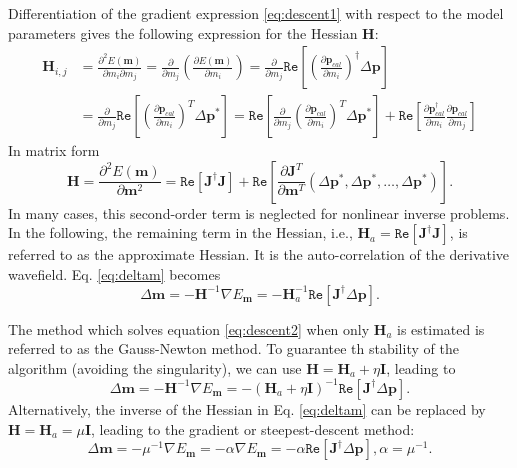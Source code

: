 Differentiation of the gradient expression \eqref{eq:descent1} with respect to the model parameters gives the following expression for the Hessian $\textbf{H}$:
\begin{equation}
\begin{split}
\textbf{H}_{i,j}&=\frac{\partial^2 E(\textbf{m})}{\partial m_i\partial m_j}
=\frac{\partial }{\partial m_j}\left(\frac{\partial E(\textbf{m})}{\partial m_i}\right)
=\frac{\partial }{\partial m_j}\mathtt{Re}\left[\left(\frac{\partial \textbf{p}_{cal}}{\partial m_i}\right)^{\dagger}\Delta \textbf{p}\right]\\
&=\frac{\partial }{\partial m_j}\mathtt{Re}\left[\left(\frac{\partial \textbf{p}_{cal}}{\partial m_i}\right)^{T}\Delta \textbf{p}^*\right]
=\mathtt{Re}\left[
\frac{\partial}{\partial m_j}\left(\frac{\partial \textbf{p}_{cal}}{\partial m_i}\right)^{T}\Delta \textbf{p}^*\right]+
\mathtt{Re}\left[
\frac{\partial\textbf{p}^{\dagger}_{cal}}{\partial m_i}\frac{\partial\textbf{p}_{cal}}{\partial m_j}\right]
\end{split}
\end{equation}
In matrix form
\begin{equation}\label{eq:descent2}
\textbf{H}=\frac{\partial^2 E(\textbf{m})}{\partial \textbf{m}^2}=\mathtt{Re}\left[\textbf{J}^{\dagger}\textbf{J}\right]+
\mathtt{Re}\left[\frac{\partial \textbf{J}^T}{\partial \textbf{m}^T}(\Delta \textbf{p}^*, \Delta \textbf{p}^*, \ldots, \Delta \textbf{p}^*)\right].
\end{equation}
In many cases, this second-order term is neglected for nonlinear inverse problems. In the following, the remaining term in the Hessian, i.e., $\textbf{H}_a=\mathtt{Re}[\textbf{J}^{\dagger}\textbf{J}]$, is referred to as the approximate Hessian. It is the auto-correlation of the derivative wavefield. Eq. \eqref{eq:deltam} becomes
\begin{equation}
\Delta \textbf{m}
=-\textbf{H}^{-1}\nabla E_{\textbf{m}}
=-\textbf{H}_a^{-1}\mathtt{Re}[\textbf{J}^{\dagger}\Delta \textbf{p}].
\end{equation}

The method which solves equation \eqref{eq:descent2} when only $\textbf{H}_a$ is estimated is referred to as the Gauss-Newton method. To guarantee th stability of the algorithm (avoiding the singularity), we can use $\textbf{H}=\textbf{H}_a+\eta \textbf{I}$, leading to
\begin{equation}
\Delta \textbf{m}
=-\textbf{H}^{-1}\nabla E_{\textbf{m}}
=-(\textbf{H}_a+\eta \textbf{I})^{-1}\mathtt{Re}\left[\textbf{J}^{\dagger}\Delta \textbf{p}\right].
\end{equation}
Alternatively, the inverse of the Hessian in Eq. \eqref{eq:deltam} can be replaced by $\textbf{H}=\textbf{H}_a=\mu \textbf{I}$,  leading to the gradient or steepest-descent method:
\begin{equation}
\Delta \textbf{m}
=-\mu^{-1}\nabla E_{\textbf{m}}
=-\alpha\nabla E_{\textbf{m}}
=-\alpha\mathtt{Re}\left[\textbf{J}^{\dagger}\Delta \textbf{p}\right],\alpha=\mu^{-1}.
\end{equation}


